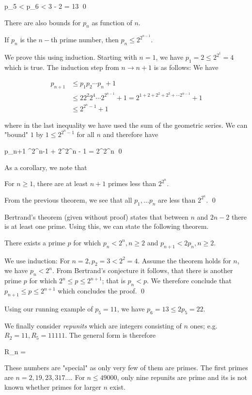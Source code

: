 \bee
p_5 < p_6 < 3  - 2 = 13 \qed
\eee

There are also bounds for $p_n$ as function of $n$.

\begin{theorem}
    If $p_n$ is the $n-$th prime number, then $p_n \leq 2^{2^{n-1}}$.
\end{theorem}

We prove this using induction. Starting with $n=1$, we have $p_1 = 2 \leq 2^{2^{1}} = 4$ which is true. The induction step from $n \rightarrow n+1$ is as follows: We have

\begin{align*}
p_{n+1} & \leq p_1 p_2 \cdots p_n + 1 \\
        & \leq 2 2^2 2^4 \cdots 2^{2^{n-1}} + 1 = 2^{1 + 2 + 2^2 + 2^3 + \cdots 2^{n-1}} + 1 \\ 
        & \leq 2^{2^{n}-1} + 1
\end{align*}

where in the last inequality we have used the sum of the geometric series. We can "bound" $1$ by $1 \leq 2^{2^{n} - 1}$ for all $n$ and therefore have

\bee
p_{n+1} ^{2^{n}-1} + 2^{2^{n} - 1} = 2^{2^{n}} \qed
\eee

As a corollary, we note that

\begin{theorem}
    For $n \geq 1$, there are at least $n+1$ primes less than $2^{2^{n}}$.
\end{theorem}

From the previous theorem, we see that all $p_1, \ldots p_n$ are less than $2^{2^{n}}$. \qed

Bertrand's theorem (given without proof) states that between $n$ and $2n-2$ there is at least one prime. Using this, we can state the following theorem.

\begin{theorem}
    There exists a prime $p$ for which $p_n < 2^n, n \geq 2$ and $p_{n+1} < 2 p_n, n \geq 2$.
\end{theorem}

We use induction: For $n = 2, p_2 = 3 < 2^2 = 4$. Assume the theorem holds for $n$, we have $p_n < 2^n$. From Bertrand's conjecture it follows, that there is another prime $p$ for which $2^n \leq p \leq 2^{n+1}$; that is $p_n < p$. We therefore conclude that $p_{n+1} \leq p \leq 2^{n+1}$ which concludes the proof. \qed

Using our running example of $p_5 = 11$, we have $p_6 = 13 \leq 2 p_5 = 22$.

We finally consider \emph{repunits} which are integers consisting of $n$ ones; e.g. $R_2 = 11, R_5 =11111$. The general form is therefore

\bee
R_n = 
\eee

These numbers are "special" as only very few of them are primes. The first primes are $n = 2, 19, 23, 317 \ldots$. For $n \leq 49000$, only nine repunits are prime and its is not known whether primes for larger $n$ exist.


